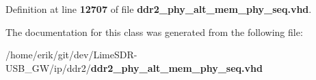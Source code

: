 Definition at line {\bf 12707} of file {\bf ddr2\+\_\+phy\+\_\+alt\+\_\+mem\+\_\+phy\+\_\+seq.\+vhd}.



The documentation for this class was generated from the following file\+:\begin{DoxyCompactItemize}
\item 
/home/erik/git/dev/\+Lime\+S\+D\+R-\/\+U\+S\+B\+\_\+\+G\+W/ip/ddr2/{\bf ddr2\+\_\+phy\+\_\+alt\+\_\+mem\+\_\+phy\+\_\+seq.\+vhd}\end{DoxyCompactItemize}
